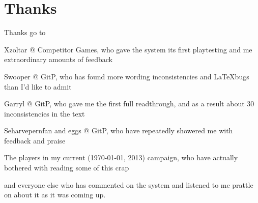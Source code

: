 \section{Thanks}
Thanks go to 
\begin{list}{}{\leftmargin=1em}
 \item Xzoltar @ Competitor Games, who gave the system its first playtesting and me extraordinary amounts of feedback
 \item Swooper @ GitP, who has found more wording inconsistencies and \LaTeX bugs than I'd like to admit
 \item Garryl @ GitP, who gave me the first full readthrough, and as a result about 30 inconsistencies in the text
 \item Seharvepernfan and eggs @ GitP, who have repeatedly showered me with feedback and praise
 \item The players in my current (\today, 2013) campaign, who have actually bothered with reading some of this crap
 \item and everyone else who has commented on the system and listened to me prattle on about it as it was coming up.
\end{list}
